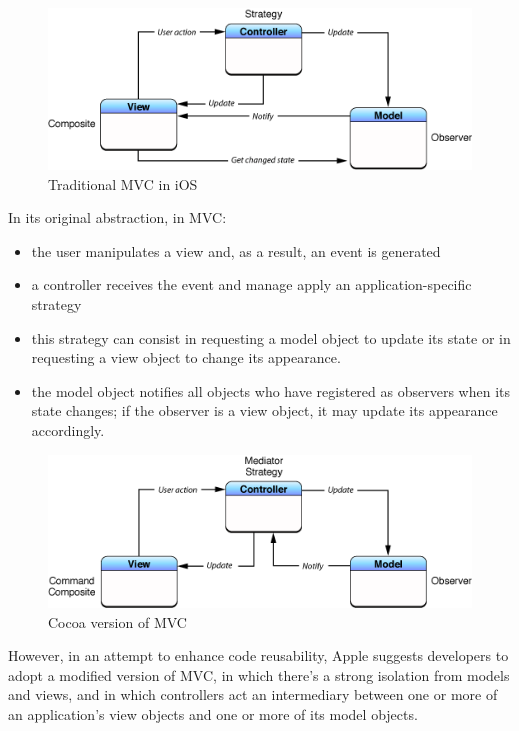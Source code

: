 \begin{figure}[htbp]
\centering
\includegraphics[scale=0.75]{imgs/ios_traditional_mvc.png}
\caption{Traditional MVC in iOS}
\end{figure}

In its original abstraction, in MVC:

\begin{itemize}
\itemsep1pt\parskip0pt
\item
  the user manipulates a view and, as a result, an event is generated
\item
  a controller receives the event and manage apply an
  application-specific strategy
\item
  this strategy can consist in requesting a model object to update its
  state or in requesting a view object to change its appearance.
\item
  the model object notifies all objects who have registered as observers
  when its state changes; if the observer is a view object, it may
  update its appearance accordingly.
\end{itemize}

\begin{figure}[htbp]
\centering
\includegraphics[scale=0.75]{imgs/cocoa_mvc.png}
\caption{Cocoa version of MVC}
\end{figure}

However, in an attempt to enhance code reusability, Apple suggests
developers to adopt a modified version of MVC, in which there's a strong
isolation from models and views, and in which controllers act an
intermediary between one or more of an application's view objects and
one or more of its model objects.


